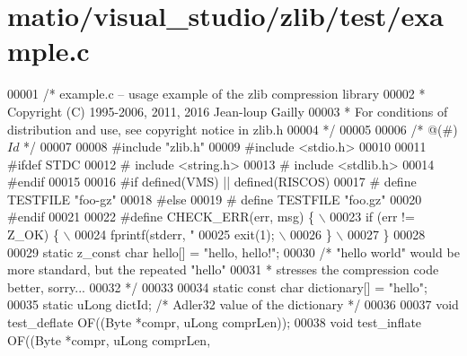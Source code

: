 \hypertarget{matio_2visual__studio_2zlib_2test_2example_8c_source}{}\section{matio/visual\+\_\+studio/zlib/test/example.c}
\label{matio_2visual__studio_2zlib_2test_2example_8c_source}

\begin{DoxyCode}
00001 \textcolor{comment}{/* example.c -- usage example of the zlib compression library}
00002 \textcolor{comment}{ * Copyright (C) 1995-2006, 2011, 2016 Jean-loup Gailly}
00003 \textcolor{comment}{ * For conditions of distribution and use, see copyright notice in zlib.h}
00004 \textcolor{comment}{ */}
00005 
00006 \textcolor{comment}{/* @(#) $Id$ */}
00007 
00008 \textcolor{preprocessor}{#include "zlib.h"}
00009 \textcolor{preprocessor}{#include <stdio.h>}
00010 
00011 \textcolor{preprocessor}{#ifdef STDC}
00012 \textcolor{preprocessor}{#  include <string.h>}
00013 \textcolor{preprocessor}{#  include <stdlib.h>}
00014 \textcolor{preprocessor}{#endif}
00015 
00016 \textcolor{preprocessor}{#if defined(VMS) || defined(RISCOS)}
00017 \textcolor{preprocessor}{#  define TESTFILE "foo-gz"}
00018 \textcolor{preprocessor}{#else}
00019 \textcolor{preprocessor}{#  define TESTFILE "foo.gz"}
00020 \textcolor{preprocessor}{#endif}
00021 
00022 \textcolor{preprocessor}{#define CHECK\_ERR(err, msg) \{ \(\backslash\)}
00023 \textcolor{preprocessor}{    if (err != Z\_OK) \{ \(\backslash\)}
00024 \textcolor{preprocessor}{        fprintf(stderr, "%
00025 \textcolor{preprocessor}{        exit(1); \(\backslash\)}
00026 \textcolor{preprocessor}{    \} \(\backslash\)}
00027 \textcolor{preprocessor}{\}}
00028 
00029 \textcolor{keyword}{static} z\_const \textcolor{keywordtype}{char} hello[] = \textcolor{stringliteral}{"hello, hello!"};
00030 \textcolor{comment}{/* "hello world" would be more standard, but the repeated "hello"}
00031 \textcolor{comment}{ * stresses the compression code better, sorry...}
00032 \textcolor{comment}{ */}
00033 
00034 \textcolor{keyword}{static} \textcolor{keyword}{const} \textcolor{keywordtype}{char} dictionary[] = \textcolor{stringliteral}{"hello"};
00035 \textcolor{keyword}{static} uLong dictId;    \textcolor{comment}{/* Adler32 value of the dictionary */}
00036 
00037 \textcolor{keywordtype}{void} test\_deflate       OF((Byte *compr, uLong comprLen));
00038 \textcolor{keywordtype}{void} test\_inflate       OF((Byte *compr, uLong comprLen,
}
\end{DoxyCode}

